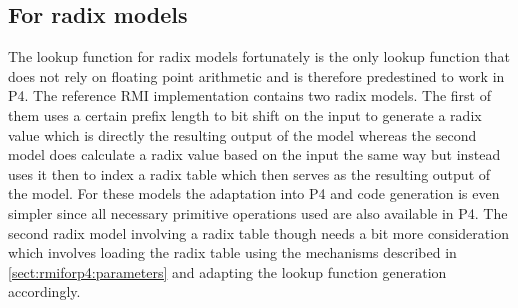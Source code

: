 \subsection{For radix models}
\label{sect:rmiforp4:radix}
The lookup function for radix models fortunately is the only lookup function that does not rely on floating point arithmetic and is therefore predestined to work in P4. The reference RMI implementation contains two radix models. The first of them uses a certain prefix length to bit shift on the input to generate a radix value which is directly the resulting output of the model whereas the second model does calculate a radix value based on the input the same way but instead uses it then to index a radix table which then serves as the resulting output of the model. For these models the adaptation into P4 and code generation is even simpler since all necessary primitive operations used are also available in P4. The second radix model involving a radix table though needs a bit more consideration which involves loading the radix table using the mechanisms described in \ref{sect:rmiforp4:parameters} and adapting the lookup function generation accordingly.

